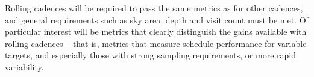 Rolling cadences will be required to pass the same metrics as for other
cadences, and general requirements such as sky area, depth and visit
count must be met.  Of particular interest will be metrics that clearly
distinguish the gains available with rolling cadences -- that is,
metrics that measure schedule performance for variable targets, and
especially those with strong sampling requirements, or more rapid
variability.

%
%
%
%
%
%
